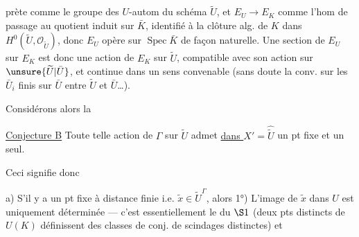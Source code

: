 prète comme le groupe  des $U$-autom du schéma $\widetilde U$, et $E_U\longrightarrow E_K$ comme l'hom de passage au quotient induit sur $\bar K$, identifié à la clôture alg. de $K$ dans $H^0(\widetilde U,\mathcal O_{\widetilde U})$, donc $E_U$ opère sur $\operatorname{Spec}\bar K$ de façon naturelle. Une section de $E_U$ sur $E_K$ est donc une action de $E_K$ sur $\widetilde U$, compatible avec son action sur $\unsure{\widetilde U|\bar U}$, et continue dans un sens convenable (sans doute la conv.  sur les  $\bar U_i$ finis sur $\bar U$ entre $\widetilde U$ et $\bar U$\ldots).

Considérons alors la

\uline{Conjecture B} Toute telle action de $\Gamma$ sur $\widetilde U$ admet \uline{dans $X'$}$=\widehat{\widetilde U}$ un pt fixe et un seul.

Ceci signifie donc

a) S'il y a un pt fixe à distance finie i.e. $\widetilde x\in\widetilde U^\Gamma$, alors 1°) L'image de $\widetilde x$ dans $U$ est uniquement déterminée --- c'est essentiellement le  du $\S1$ (deux pts distincts de $U(K)$ définissent des classes de conj. de scindages distinctes) et
